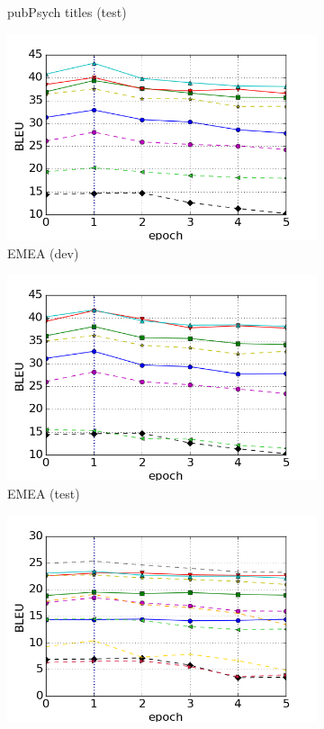 \documentclass[a4paper,11pt]{article}
\begin{document}
\begin{figure}
\begin{subfigure}[b]{0.45\textwidth}
        \caption{pubPsych titles (test)}
        \label{fig:pp_tit}
    \end{subfigure}
    \begin{subfigure}[b]{0.45\textwidth}
        \includegraphics[width=\textwidth]{./img/adam/emea_dev}
        \caption{EMEA (dev)}
        \label{fig:emea_dev}
    \end{subfigure}
    \begin{subfigure}[b]{0.45\textwidth}
        \includegraphics[width=\textwidth]{./img/adam/emea_test}
        \caption{EMEA (test)}
        \label{fig:emea_test}
    \end{subfigure}
    \begin{subfigure}[b]{0.45\textwidth}
        \includegraphics[width=\textwidth]{./img/adam/newstest}

\end{subfigure}
\end{figure}
\end{document}
